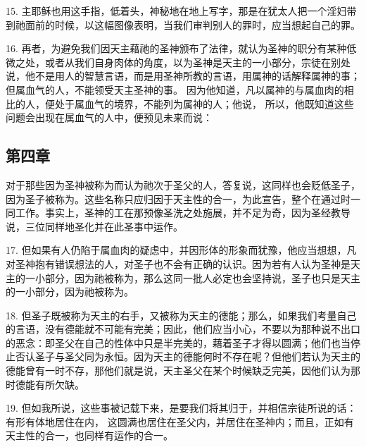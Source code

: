 15. 主耶稣也用这手指，低着头，神秘地在地上写字，那是在犹太人把一个淫妇带到祂面前的时候，以这幅图像表明，当我们审判别人的罪时，应当想起自己的罪。\par

16. 再者，为避免我们因天主藉祂的圣神颁布了法律，就认为圣神的职分有某种低微之处，或者从我们自身肉体的角度，以为圣神是天主的一小部分，宗徒在别处说，他不是用人的智慧言语，而是用圣神所教的言语，用属神的话解释属神的事；但属血气的人，不能领受天主圣神的事。 因为他知道，凡以属神的与属血肉的相比的人，便处于属血气的境界，不能列为属神的人；他说， 所以，他既知道这些问题会出现在属血气的人中，便预见未来而说：\par


\subsection{第四章}

对于那些因为圣神被称为而认为祂次于圣父的人，答复说，这同样也会贬低圣子，因为圣子被称为。这些名称只应归因于天主性的合一，为此宣告，整个在通过时一同工作。事实上，圣神的工在那预像圣洗之处施展，并不足为奇，因为圣经教导说，三位同样地圣化并在此圣事中运作。\par

17. 但如果有人仍陷于属血肉的疑虑中，并因形体的形象而犹豫，他应当想想，凡对圣神抱有错误想法的人，对圣子也不会有正确的认识。因为若有人认为圣神是天主的一小部分，因为祂被称为，那么这同一批人必定也会坚持说，圣子也只是天主的一小部分，因为祂被称为。\par

18. 但圣子既被称为天主的右手，又被称为天主的德能；那么，如果我们考量自己的言语，没有德能就不可能有完美；因此，他们应当小心，不要以为那种说不出口的恶念：即圣父在自己的性体中只是半完美的，藉着圣子才得以圆满；他们也当停止否认圣子与圣父同为永恒。因为天主的德能何时不存在呢？但他们若认为天主的德能曾有一时不存，那他们就是说，天主圣父在某个时候缺乏完美，因他们认为那时德能有所欠缺。\par

19. 但如我所说，这些事被记载下来，是要我们将其归于，并相信宗徒所说的话：有形有体地居住在内， 这圆满也居住在圣父内，并居住在圣神内；而且，正如有天主性的合一，也同样有运作的合一。\par

